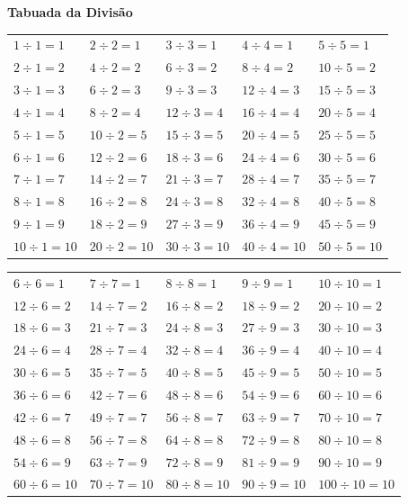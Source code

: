 \documentclass[12pt,twoside]{article}
\begin{document}
\begin{center}
     \textbf{\Large Tabuada da Divisão}
\end{center}

\setlength{\tabcolsep}{17pt}
\begin{tabular}{lllll}
$1\div1=1$  &$2\div2=1$  &$3\div3=1$  &$4\div4=1$  &$5\div5=1$  \\
$2\div1=2$  &$4\div2=2$  &$6\div3=2$  &$8\div4=2$  &$10\div5=2$ \\
$3\div1=3$  &$6\div2=3$  &$9\div3=3$  &$12\div4=3$ &$15\div5=3$ \\
$4\div1=4$  &$8\div2=4$  &$12\div3=4$ &$16\div4=4$ &$20\div5=4$ \\
$5\div1=5$  &$10\div2=5$ &$15\div3=5$ &$20\div4=5$ &$25\div5=5$ \\
$6\div1=6$  &$12\div2=6$ &$18\div3=6$ &$24\div4=6$ &$30\div5=6$ \\
$7\div1=7$  &$14\div2=7$ &$21\div3=7$ &$28\div4=7$ &$35\div5=7$ \\
$8\div1=8$  &$16\div2=8$ &$24\div3=8$ &$32\div4=8$ &$40\div5=8$ \\
$9\div1=9$  &$18\div2=9$ &$27\div3=9$ &$36\div4=9$ &$45\div5=9$ \\
$10\div1=10$&$20\div2=10$&$30\div3=10$&$40\div4=10$&$50\div5=10$\\
\end{tabular}

\vspace{0.5cm}

\begin{tabular}{lllll}
$6\div6=1$  &$7\div7=1$  &$8\div8=1$  &$9\div9=1$  &$10\div10=1$  \\
$12\div6=2$ &$14\div7=2$ &$16\div8=2$ &$18\div9=2$ &$20\div10=2$  \\
$18\div6=3$ &$21\div7=3$ &$24\div8=3$ &$27\div9=3$ &$30\div10=3$  \\
$24\div6=4$ &$28\div7=4$ &$32\div8=4$ &$36\div9=4$ &$40\div10=4$  \\
$30\div6=5$ &$35\div7=5$ &$40\div8=5$ &$45\div9=5$ &$50\div10=5$  \\
$36\div6=6$ &$42\div7=6$ &$48\div8=6$ &$54\div9=6$ &$60\div10=6$  \\
$42\div6=7$ &$49\div7=7$ &$56\div8=7$ &$63\div9=7$ &$70\div10=7$  \\
$48\div6=8$ &$56\div7=8$ &$64\div8=8$ &$72\div9=8$ &$80\div10=8$  \\
$54\div6=9$ &$63\div7=9$ &$72\div8=9$ &$81\div9=9$ &$90\div10=9$  \\
$60\div6=10$&$70\div7=10$&$80\div8=10$&$90\div9=10$&$100\div10=10$\\
\end{tabular}


\end{document}
